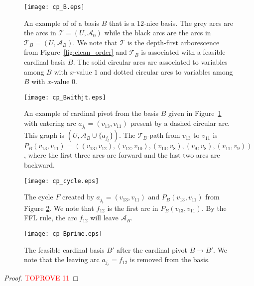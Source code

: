 \documentclass[11pt]{article}
\begin{document}
\begin{figure}[h!]
    \centering
    \texttt{[image: cp\_B.eps]}
    \caption{An example of of a basis $B$ that is a $12$-nice basis. The grey arcs are the arcs in  $\mathcal{T}=(U,\mathcal{A}_0)$ while the black arcs are the arcs in $\mathcal{T}_B=(U,\mathcal{A}_B)$. We note that $\mathcal{T}$ is the depth-first arborescence from Figure~\ref{fig:clean_order} and $\mathcal{T}_B$ is associated with a feasible cardinal basis $B$. The solid circular arcs are associated to variables among $B$ with $x$-value $1$ and dotted circular arcs to variables among $B$ with $x$-value $0$. }
    \label{fig:Pivoting-Ex-B}
\end{figure}

\begin{figure}[h!]
    \centering
    \texttt{[image: cp\_Bwithjt.eps]}
    \caption{An example of cardinal pivot from the basis $B$ given in Figure~\ref{fig:Pivoting-Ex-B} with entering arc $a_{j_t}=(v_{13},v_{11})$ present by a dashed circular arc. This graph is $(U,\mathcal{A}_B\cup\{a_{j_t}\})$. The $\mathcal{T}_B$-path from $v_{13}$ to $v_{11}$ is $P_B(v_{13},v_{11})=((v_{13},v_{12}),(v_{12},v_{10}),(v_{10},v_{8}),(v_{9},v_{8}),(v_{11},v_9))$, where the first three arcs are forward and the last two arcs are backward.}
    \label{fig:Pivoting-Ex-jt}
\end{figure}

\begin{figure}[h!]
    \centering
    \texttt{[image: cp\_cycle.eps]}
    \caption{The cycle $F$ created by $a_{j_t}=(v_{13},v_{11})$ and $P_B(v_{13},v_{11})$ from Figure \ref{fig:Pivoting-Ex-jt}. We note that $f_{12}$ is the first arc in $P_B(v_{13},v_{11})$. By the FFL rule, the arc $f_{12}$ will leave $\mathcal{A}_B$.}
    \label{fig:Pivoting-Ex-cycle}
\end{figure}

\begin{figure}[h!]
    \centering
    \texttt{[image: cp\_Bprime.eps]}
    \caption{The feasible cardinal basis $B'$ after the cardinal pivot $B\to B'$. We note that the leaving arc $a_{j_\ell}=f_{12}$ is removed from the basis.}
    \label{fig:Pivoting-Ex-B'}
\end{figure}
\begin{proof}\textcolor{red}{TOPROVE 11}\end{proof}
\end{document}
